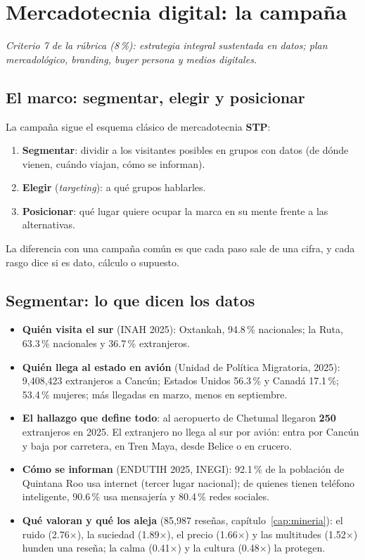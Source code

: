 \chapter{Mercadotecnia digital: la campaña}
\label{cap:mkt}
\textit{Criterio 7 de la rúbrica (8\,\%): estrategia integral sustentada en datos; plan mercadológico, branding, buyer
persona y medios digitales.}

\section{El marco: segmentar, elegir y posicionar}
La campaña sigue el esquema clásico de mercadotecnia \textbf{STP}:
\begin{enumerate}
\item \textbf{Segmentar}: dividir a los visitantes posibles en grupos con datos (de dónde vienen, cuándo viajan, cómo se
  informan).
\item \textbf{Elegir} (\emph{targeting}): a qué grupos hablarles.
\item \textbf{Posicionar}: qué lugar quiere ocupar la marca en su mente frente a las alternativas.
\end{enumerate}
La diferencia con una campaña común es que cada paso sale de una cifra, y cada rasgo dice si es dato, cálculo o supuesto.

\section{Segmentar: lo que dicen los datos}
\begin{itemize}
\item \textbf{Quién visita el sur} (INAH 2025): Oxtankah, 94.8\,\% nacionales; la Ruta, 63.3\,\% nacionales y 36.7\,\%
  extranjeros.
\item \textbf{Quién llega al estado en avión} (Unidad de Política Migratoria, 2025): 9,408,423 extranjeros a Cancún;
  Estados Unidos 56.3\,\% y Canadá 17.1\,\%; 53.4\,\% mujeres; más llegadas en marzo, menos en septiembre.
\item \textbf{El hallazgo que define todo}: al aeropuerto de Chetumal llegaron \textbf{250} extranjeros en 2025. El
  extranjero no llega al sur por avión: entra por Cancún y baja por carretera, en Tren Maya, desde Belice o en crucero.
\item \textbf{Cómo se informan} (ENDUTIH 2025, INEGI): 92.1\,\% de la población de Quintana Roo usa internet (tercer lugar
  nacional); de quienes tienen teléfono inteligente, 90.6\,\% usa mensajería y 80.4\,\% redes sociales.
\item \textbf{Qué valoran y qué los aleja} (85,987 reseñas, capítulo~\ref{cap:mineria}): el ruido (2.76$\times$), la
  suciedad (1.89$\times$), el precio (1.66$\times$) y las multitudes (1.52$\times$) hunden una reseña; la calma
  (0.41$\times$) y la cultura (0.48$\times$) la protegen.
\end{itemize}

